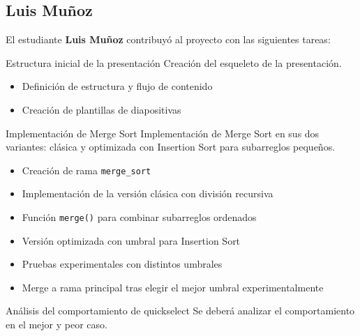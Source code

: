\subsection*{Luis Muñoz}
El estudiante \textbf{Luis Muñoz} contribuyó al proyecto con las siguientes tareas:

\begin{taskdone}{Estructura inicial de la presentación}
    Creación del esqueleto de la presentación.
    \begin{itemize}
        \item Definición de estructura y flujo de contenido
        \item Creación de plantillas de diapositivas
    \end{itemize}

\end{taskdone}

\begin{taskdone}{Implementación de Merge Sort}
    Implementación de Merge Sort en sus dos variantes: clásica y optimizada con Insertion Sort para subarreglos pequeños.
    \begin{itemize}
        \item Creación de rama \texttt{merge\_sort}
        \item Implementación de la versión clásica con división recursiva
        \item Función \texttt{merge()} para combinar subarreglos ordenados
        \item Versión optimizada con umbral para Insertion Sort
        \item Pruebas experimentales con distintos umbrales
        \item Merge a rama principal tras elegir el mejor umbral experimentalmente
    \end{itemize}
\end{taskdone}

\begin{taskdone}{Análisis del comportamiento de quickselect}
    Se deberá analizar el comportamiento en el mejor y peor caso.
\end{taskdone}